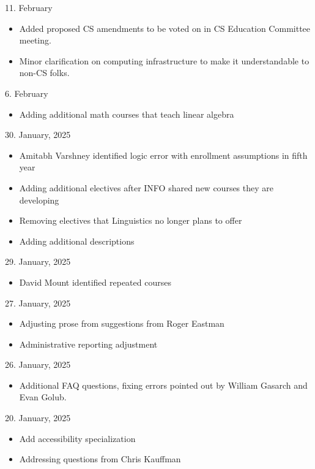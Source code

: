 11. February

\begin{itemize}
    \item Added proposed CS amendments to be voted on in CS Education Committee meeting.
    \item Minor clarification on computing infrastructure to make it understandable to non-CS folks.
\end{itemize}

6. February
\begin{itemize}
  \item Adding additional math courses that teach linear algebra
\end{itemize}

30. January, 2025
\begin{itemize}
  \item Amitabh Varshney identified logic error with enrollment assumptions in fifth year
  \item Adding additional electives after INFO shared new courses they are developing
  \item Removing electives that Linguistics no longer plans to offer 
  \item Adding additional descriptions
\end{itemize}

29. January, 2025
\begin{itemize}
  \item David Mount identified repeated courses
\end{itemize}

27. January, 2025
\begin{itemize}
    \item Adjusting prose from suggestions from Roger Eastman
    \item Administrative reporting adjustment
\end{itemize}

26. January, 2025
\begin{itemize}
  \item Additional FAQ questions, fixing errors pointed out by William Gasarch and Evan Golub.
\end{itemize}

20. January, 2025
\begin{itemize}
 \item Add accessibility specialization
 \item Addressing questions from Chris Kauffman
\end{itemize}

